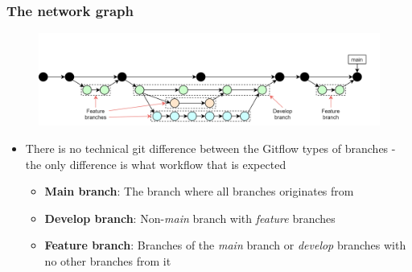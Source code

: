 \documentclass[aspectratio=169]{beamer} %
\begin{document}
\begin{frame}
	\frametitle{The network graph}

	\vspace{-.5cm}
	\begin{minipage}[t][5cm][t]{\textwidth}
		\begin{figure}
			\centering
			\includegraphics[width=\textwidth]{./img/dime-gitflow-network-names.png}
		\end{figure}
	\end{minipage}

	\vspace{-1cm}
	\begin{minipage}[t][5cm][t]{\textwidth}
		\begin{itemize}
			\setlength\itemsep{.4em}
			\item There is no technical git difference between
			the Gitflow types of branches
			- the only difference is what workflow that is expected
			\begin{itemize}
				\setlength\itemsep{.5em}
				\item \textbf{Main branch}:
				The branch where all branches originates from
				\item \textbf{Develop branch}:
				Non-\textit{main} branch with \textit{feature} branches
				\item \textbf{Feature branch}:
				Branches of the \textit{main} branch or
				\textit{develop} branches with no other branches from it
			\end{itemize}
		\end{itemize}
	\end{minipage}
\end{frame}
\end{document}
